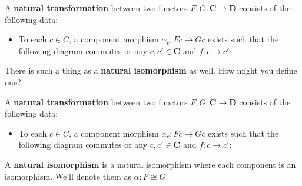 \documentclass[tikz]{beamer}
\theoremstyle{definition}
\begin{document}
\begin{frame}[fragile]
    
    \begin{definition}
        A \textbf{natural transformation} between two functors $F,G: \mathbf{C} \to \mathbf{D}$ consists of the following data: 
        
        \begin{itemize}
            \item To each $c \in C$, a component morphism $\alpha_c : Fc \to Gc$ exists such that the following diagram commutes or any $c, c' \in \mathbf{C}$ and $f: c \to c'$:
            \begin{center}
                {}
            \end{center}{}
        \end{itemize}{}
        
    \end{definition}{}
 
 There is such a thing as a \textbf{natural isomorphism} as well. How might you define one?
\end{frame}

\begin{frame}[fragile]
    
    \begin{definition}
        A \textbf{natural transformation} between two functors $F,G: \mathbf{C} \to \mathbf{D}$ consists of the following data: 
        
        \begin{itemize}
            \item To each $c \in C$, a component morphism $\alpha_c : Fc \to Gc$ exists such that the following diagram commutes or any $c, c' \in \mathbf{C}$ and $f: c \to c'$:
            \begin{center}
                {}
            \end{center}{}
        \end{itemize}{}
        
    \end{definition}{}
    
    \begin{definition}
      A \textbf{natural isomorphism} is a natural isomorphism where each component is an isomorphism. We'll denote them as $\alpha: F \cong G$.
    \end{definition}{}
\end{frame}
\end{document}
